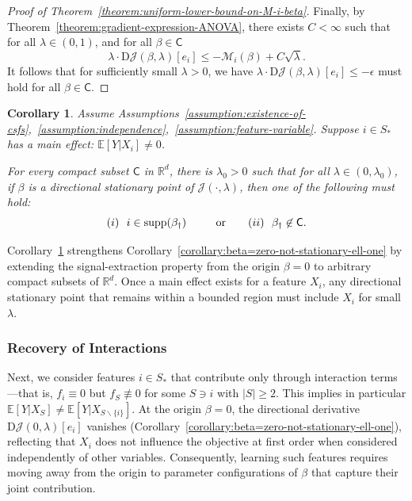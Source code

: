 \documentclass[sn-mathphys-num]{sn-jnl}%
\numberwithin{equation}{section}
\newcommand{\R}{\mathbb{R}}
\newcommand{\E}{\mathbb{E}}
\newtheorem{corollary}{Corollary}
\newcommand{\eps}{\epsilon}
\newcommand{\supp}{\mathop{\rm supp}}
\theoremstyle{thmstyleone}%
\theoremstyle{thmstyletwo}%
\theoremstyle{thmstylethree}%
\begin{document}
\begin{proof}[Proof of Theorem~\ref{theorem:uniform-lower-bound-on-M-i-beta}]
Finally, by Theorem~\ref{theorem:gradient-expression-ANOVA}, there exists $C < \infty$ such that for all $\lambda \in (0, 1)$,
and for all $\beta \in \mathsf{C}$
\begin{equation*}
	\lambda \cdot \mathrm{D}\mathcal{J}(\beta, \lambda)[e_i] \le -\mathcal{M}_i(\beta) + C \sqrt{\lambda}.
\end{equation*}
It follows that for sufficiently small \( \lambda > 0 \), we have
$\lambda \cdot \mathrm{D}\mathcal{J}(\beta, \lambda)[e_i] \le -\eps$ must hold for all $\beta \in \mathsf{C}$.
\end{proof} 



\vspace{.5em} 
\begin{corollary}
\label{corollary:extraction-of-main-effect}
Assume Assumptions~\ref{assumption:existence-of-csfs},~\ref{assumption:independence},~\ref{assumption:feature-variable}. Suppose $i \in S_*$ has a main effect: $\E[Y|X_i] \ne 0$.
 
For every compact subset $\mathsf{C}$ in $\R^d$, there is $\lambda_0 > 0$ such that for all 
$\lambda \in (0, \lambda_0)$, if $\beta$ is a directional stationary point of $\mathcal{J}(\cdot, \lambda)$, 
then one of the following must hold: 
\begin{equation*}
	(i)~~i \in \supp(\beta_{\dag})~~\qquad \text{or} \qquad (ii)~~\beta_{\dag} \not \in \mathsf{C}.
\end{equation*} 
\end{corollary} 

Corollary~\ref{corollary:extraction-of-main-effect} strengthens Corollary~\ref{corollary:beta=zero-not-stationary-ell-one} by extending the signal-extraction property from the origin $\beta = 0$ to arbitrary compact subsets of $\R^d$. Once a main effect exists for a feature $X_i$, any directional stationary point that remains within a bounded region must include $X_i$ for small $\lambda$. 



\subsubsection{Recovery of Interactions} 
Next, we consider features $i \in S_*$ that contribute only through interaction terms---that is, $f_{{i}} \equiv 0$ but $f_S \not\equiv 0$ for some $S \ni i$ with $|S| \ge 2$. This implies in particular $\E[Y|X_S] \ne \E[Y|X_{S \backslash \{i\}}]$. At the origin $\beta = 0$, the directional derivative $\mathrm{D}\mathcal{J}(0, \lambda)[e_i]$ vanishes (Corollary~\ref{corollary:beta=zero-not-stationary-ell-one}), reflecting that $X_i$ does not influence the objective at first order when considered independently of other variables. Consequently, learning such features requires moving away from the origin to parameter configurations of $\beta$ that capture their joint contribution.
\end{document}

